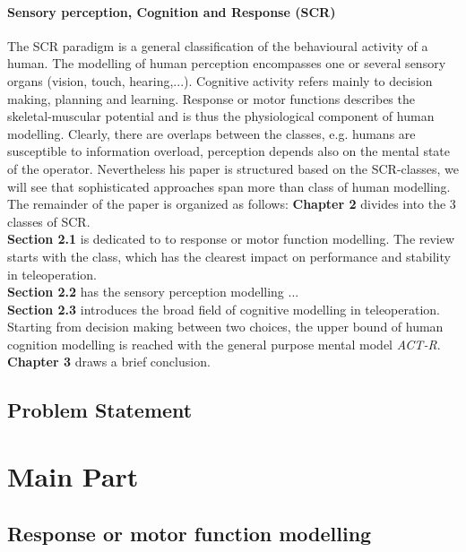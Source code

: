 \documentclass[a4paper,twoside, openright,12pt]{report}
\begin{document}
\subsubsection{Sensory perception, Cognition and Response (SCR)}
The SCR paradigm is a general classification of the behavioural activity of a human. The modelling of human perception encompasses one or several sensory organs (vision, touch, hearing,...). Cognitive activity refers mainly to decision making, planning and learning. Response or motor functions describes the skeletal-muscular potential and is thus the physiological component of human modelling. Clearly, there are overlaps between the classes, e.g. humans are susceptible to information overload, perception depends also on the mental state of the operator. Nevertheless his paper is structured based on the SCR-classes, we will see that sophisticated approaches span more than class of human modelling.\\
The remainder of the paper is organized as follows: \textbf{Chapter 2} divides into the 3 classes of SCR.\\
\textbf{Section 2.1} is dedicated to to response or motor function modelling. The review starts with the class, which has the clearest impact on performance and stability in teleoperation.\\
\textbf{Section 2.2} has the sensory perception modelling ...\\
\textbf{Section 2.3} introduces the broad field of cognitive modelling in teleoperation. Starting from decision making between two choices, the upper bound of human cognition modelling is reached with the general purpose mental model \emph{ACT-R}.\\
\textbf{Chapter 3} draws a brief conclusion.
  




\section{Problem Statement}









\chapter{Main Part}
\section{Response or motor function modelling}
\end{document}
